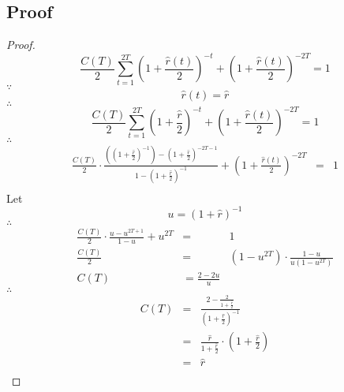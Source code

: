 \subsection{Proof}
\begin{proof}
    \[
        \frac{C(T)}{2}\sum\limits_{t = 1}^{2T}
        \left(1 + \frac{\hat{r}(t)}{2}\right)^{-t} +
        \left(1 + \frac{\hat{r}(t)}{2}\right)^{-2T} = 1
    \]
    $\because$
    \[\hat{r}(t) = \hat{r}\]
    $\therefore$
    \[
        \frac{C(T)}{2}\sum\limits_{t = 1}^{2T}
        \left(1 + \frac{\hat{r}}{2}\right)^{-t} +
        \left(1 + \frac{\hat{r}(t)}{2}\right)^{-2T} = 1
    \]
    $\therefore$
    \[
        \begin{array}{lll}
            \frac{C(T)}{2}\cdot
            \frac
            {
                \left((1 + \frac{\hat{r}}{2})^{-1}\right) -
                \left(1 + \frac{\hat{r}}{2}\right)^{-2T - 1}
            }
            {1 - (1 + \frac{\hat{r}}{2})^{-1}} +
            \left(1 + \frac{\hat{r}(t)}{2}\right)^{-2T} &= &1\\
        \end{array}
    \]
    Let \[u = (1 + \hat{r})^{-1}\]
    $\therefore$
    \[
        \begin{array}{lll}
            \frac{C(T)}{2}\cdot
            \frac
            {
                u -
                u^{2T + 1}
            }
            {1 - u} +
            u^{2T} &= &1\\
            \frac{C(T)}{2} &= &
            \left(1 - u^{2T}\right)\cdot
            \frac{1 - u}{u\left(1 - u^{2T}\right)}\\
            C(T) &= \frac{2 - 2u}{u}
        \end{array}
    \]
    $\therefore$
    \[
        \begin{array}{lll}
            C(T) &= &
            \frac
            {2 - \frac{2}{1 + \frac{\hat{r}}{2}}}
            {\left(1 + \frac{\hat{r}}{2}\right)^{-1}}\\
            &= &
            \frac{\hat{r}}{1 + \frac{\hat{r}}{2}}\cdot
            \left(1 + \frac{\hat{r}}{2}\right)\\
            &= &\hat{r}\\
        \end{array}
    \]
\end{proof}
